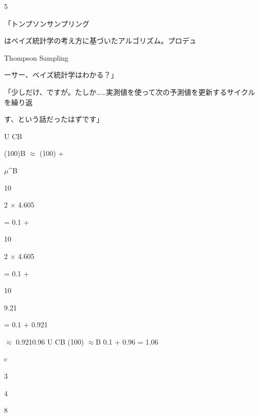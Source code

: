5\par
「トンプソンサンプリング\par
はベイズ統計学の考え⽅に基づいたアルゴリズム。プロデュ\par
Thompson Sampling\par
ーサー、ベイズ統計学はわかる？」\par
「少しだけ、ですが。たしか……実測値を使って次の予測値を更新するサイクルを繰り返\par
す、という話だったはずです」\par
U CB\par
(100)B $\approx$   (100) +\par
$\mu$\textasciicircum{}B\par
10\par
2 $\times$ 4.605\par
= 0.1 +\par
10\par
2 $\times$ 4.605\par
= 0.1 +\par
10\par
9.21\par
= 0.1 +  0.921\par
$\approx$ 0.9210.96 U CB  (100) $\approx$B 0.1 + 0.96 = 1.06\par
c\par
3\par
4\par
8\par

